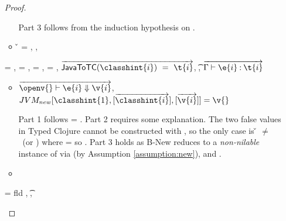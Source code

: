 \begin{lemma}
\begin{enumerate}
\begin{proof}
\begin{case}[T-Do]
\begin{itemize}
\begin{subcase}[B-Do]
Part 3 follows from the induction hypothesis on .
    \end{subcase}
  \item[]
\begin{subcase}[BE-Do]
  \v{} = {},
\opsem {\openv{}} {} {},



\end{subcase}
\end{itemize}
\end{case}

\begin{case}[T-NewStatic]
  \e{} = { {\classhint{}} 
                                                          {\class{}} {}},
  \object{} = \emptyobject{},
\thenprop{\prop{}} = \topprop{},
\elseprop{\prop{}} = \botprop{},
   $\overrightarrow{
\javatotc {\classhint{i}}
          {\t{i}}
          }$,
  \javatotc {\classhint{}}
            {\t{}},
            $
  \overrightarrow{
  \judgementtwo {\propenv{}}
                    {\hastype {\e{i}} {\t{i}}}
                  }$

\begin{itemize}
  \item[]
\begin{subcase}[B-New]
  $
  \overrightarrow{
  \opsem {\openv{}}
         {\e{i}}
         {\v{i}}
       }$,
         $\newjava {\classhint{1}}
                  {\overrightarrow{\classhint{i}}}
                  {\overrightarrow{\v{i}}}
                  {\v{}}$

Part 1 follows \object{} = \emptyobject{}.
Part 2 requires some explanation. The two false values in Typed Clojure
cannot be constructed with \newliteral, so the only case is \v{} $\not=$ \false\ (or \nil)
where \thenprop{\prop{}} = \topprop{} so \satisfies{\openv{}}{\thenprop{\prop{}}}.
Part 3 holds as B-New reduces to a \emph{non-nilable}
instance of \class{} via \newjavaliteral (by Assumption \ref{assumption:new}), and \javatotc{\classhint{}}{\t{}}.
\end{subcase}
  \item[]
\begin{subcase}[BE-New]
\end{subcase}
\end{itemize}
\end{case}

\begin{case}[T-FieldStatic]
  \e{} = { {} {fld} {}}
   {\class{}},
   {\t{}},
  \judgementtwo {\propenv{}} { {\class{}}}


\end{case}
\end{proof}
\end{enumerate}
\end{lemma}
